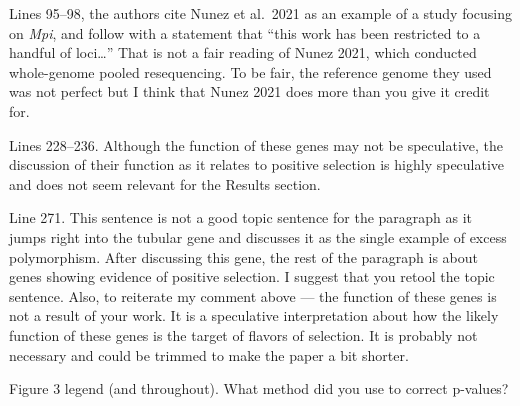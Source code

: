 
\begin{point}{} %
Lines 95--98, the authors cite Nunez et al.\ 2021 as an example of a
study focusing on \emph{Mpi}, and follow with a statement that ``this
work has been restricted to a handful of loci\ldots'' That is not a
fair reading of Nunez 2021, which conducted whole-genome pooled
resequencing. To be fair, the reference genome they used was not perfect
but I think that Nunez 2021 does more than you give it credit for.
\end{point}


\begin{point}{} %
Lines 228--236. Although the function of these genes may not be
speculative, the discussion of their function as it relates to positive
selection is highly speculative and does not seem relevant for the
Results section.
\end{point}


\begin{point}{} %
Line 271. This sentence is not a good topic sentence for the paragraph
as it jumps right into the tubular gene and discusses it as the single
example of excess polymorphism. After discussing this gene, the rest of
the paragraph is about genes showing evidence of positive selection. I
suggest that you retool the topic sentence. Also, to reiterate my
comment above --- the function of these genes is not a result of your
work. It is a speculative interpretation about how the likely function
of these genes is the target of flavors of selection. It is probably not
necessary and could be trimmed to make the paper a bit shorter.
\end{point}


\begin{point}{} %
Figure 3 legend (and throughout). What method did you use to correct
p-values?
\end{point}

